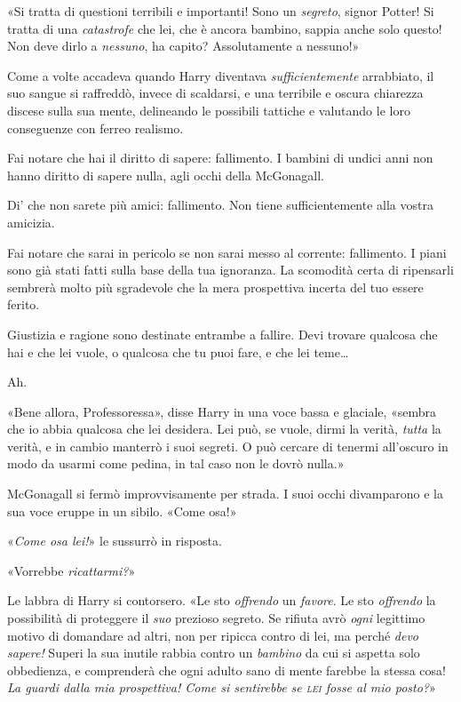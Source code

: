 «Si tratta di questioni terribili e importanti! Sono un \textit{segreto}, signor Potter! Si tratta di una \textit{catastrofe} che lei, che è ancora bambino, sappia anche solo questo! Non deve dirlo a \textit{nessuno}, ha capito? Assolutamente a nessuno!»

Come a volte accadeva quando Harry diventava \textit{sufficientemente} arrabbiato, il suo sangue si raffreddò, invece di scaldarsi, e una terribile e oscura chiarezza discese sulla sua mente, delineando le possibili tattiche e valutando le loro conseguenze con ferreo realismo.

\begin{itpars}
Fai notare che hai il diritto di sapere: fallimento. I bambini di undici anni non hanno diritto di sapere nulla, agli occhi della McGonagall.

Di’ che non sarete più amici: fallimento. Non tiene sufficientemente alla vostra amicizia.

Fai notare che sarai in pericolo se non sarai messo al corrente: fallimento. I piani sono già stati fatti sulla base della tua ignoranza. La scomodità certa di ripensarli sembrerà molto più sgradevole che la mera prospettiva incerta del tuo essere ferito.

Giustizia e ragione sono destinate entrambe a fallire. Devi trovare qualcosa che hai e che lei vuole, o qualcosa che tu puoi fare, e che lei teme…
\end{itpars}

Ah.

«Bene allora, Professoressa», disse Harry in una voce bassa e glaciale, «sembra che io abbia qualcosa che lei desidera. Lei può, se vuole, dirmi la verità, \textit{tutta} la verità, e in cambio manterrò i suoi segreti. O può cercare di tenermi all’oscuro in modo da usarmi come pedina, in tal caso non le dovrò nulla.»

McGonagall si fermò improvvisamente per strada. I suoi occhi divamparono e la sua voce eruppe in un sibilo. «Come osa!»

«\textit{Come osa lei!}» le sussurrò in risposta.

«Vorrebbe \textit{ricattarmi?}»

Le labbra di Harry si contorsero. «Le sto \textit{offrendo} un \textit{favore}. Le sto \textit{offrendo} la possibilità di proteggere il \textit{suo} prezioso segreto. Se rifiuta avrò \textit{ogni} legittimo motivo di domandare ad altri, non per ripicca contro di lei, ma perché \textit{devo sapere!} Superi la sua inutile rabbia contro un \textit{bambino} da cui si aspetta solo obbedienza, e comprenderà che ogni adulto sano di mente farebbe la stessa cosa! \textit{La guardi dalla mia prospettiva! Come si sentirebbe se \textsc{lei} fosse al mio posto?}»

